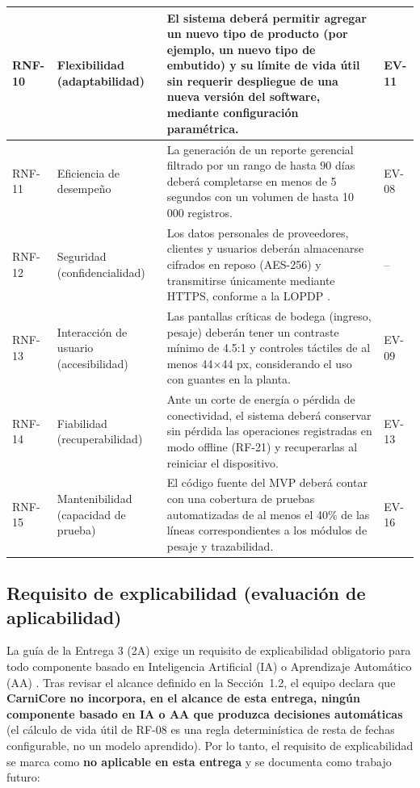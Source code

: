\documentclass[11pt,a4paper]{article}
\begin{document}
\begin{longtable}{|p{1.2cm}|p{2.5cm}|p{8.3cm}|p{1.6cm}|}
\hline
RNF-10 & Flexibilidad (adaptabilidad) & El sistema deberá permitir agregar un nuevo tipo de producto (por ejemplo, un nuevo tipo de embutido) y su límite de vida útil sin requerir despliegue de una nueva versión del software, mediante configuración paramétrica. & EV-11 \\
\hline
RNF-11 & Eficiencia de desempeño & La generación de un reporte gerencial filtrado por un rango de hasta 90 días deberá completarse en menos de 5 segundos con un volumen de hasta 10\,000 registros. & EV-08 \\
\hline
RNF-12 & Seguridad (confidencialidad) & Los datos personales de proveedores, clientes y usuarios deberán almacenarse cifrados en reposo (AES-256) y transmitirse únicamente mediante HTTPS, conforme a la LOPDP \cite{lopd2021}. & -- \\
\hline
RNF-13 & Interacción de usuario (accesibilidad) & Las pantallas críticas de bodega (ingreso, pesaje) deberán tener un contraste mínimo de 4.5:1 y controles táctiles de al menos 44$\times$44 px, considerando el uso con guantes en la planta. & EV-09 \\
\hline
RNF-14 & Fiabilidad (recuperabilidad) & Ante un corte de energía o pérdida de conectividad, el sistema deberá conservar sin pérdida las operaciones registradas en modo offline (RF-21) y recuperarlas al reiniciar el dispositivo. & EV-13 \\
\hline
RNF-15 & Mantenibilidad (capacidad de prueba) & El código fuente del MVP deberá contar con una cobertura de pruebas automatizadas de al menos el 40\% de las líneas correspondientes a los módulos de pesaje y trazabilidad. & EV-16 \\
\hline
\end{longtable}

\subsection{Requisito de explicabilidad (evaluación de aplicabilidad)}
La guía de la Entrega 3 (2A) exige un requisito de explicabilidad obligatorio para todo componente basado en Inteligencia Artificial (IA) o Aprendizaje Automático (AA) \cite{chazette2020explainability,chazette2021exploring,chazette2022explainable}. Tras revisar el alcance definido en la Sección~1.2, el equipo declara que \textbf{CarniCore no incorpora, en el alcance de esta entrega, ningún componente basado en IA o AA que produzca decisiones automáticas} (el cálculo de vida útil de RF-08 es una regla determinística de resta de fechas configurable, no un modelo aprendido). Por lo tanto, el requisito de explicabilidad se marca como \textbf{no aplicable en esta entrega} y se documenta como trabajo futuro:
\end{document}
